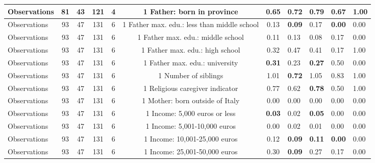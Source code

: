 \begin{tabular}{l c c c c c c }
\midrule
Observations &        81 &        43 &       121 &         4 &         1
Father: born in province &      0.65 &      0.72 & \textbf{     0.79} &      0.67 &      1.00 \\
\midrule
Observations &        93 &        47 &       131 &         6 &         1
Father max. edu.: less than middle school &      0.13 & \textbf{     0.09} &      0.17 & \textbf{     0.00} &      0.00 \\
\midrule
Observations &        93 &        47 &       131 &         6 &         1
Father max. edu.: middle school &      0.11 &      0.13 &      0.08 &      0.17 &      0.00 \\
\midrule
Observations &        93 &        47 &       131 &         6 &         1
Father max. edu.: high school &      0.32 &      0.47 &      0.41 &      0.17 &      1.00 \\
\midrule
Observations &        93 &        47 &       131 &         6 &         1
Father max. edu.: university & \textbf{     0.31} &      0.23 & \textbf{     0.27} &      0.50 &      0.00 \\
\midrule
Observations &        93 &        47 &       131 &         6 &         1
Number of siblings &      1.01 & \textbf{     0.72} &      1.05 &      0.83 &      1.00 \\
\midrule
Observations &        93 &        47 &       131 &         6 &         1
Religious caregiver indicator &      0.77 &      0.62 & \textbf{     0.78} &      0.50 &      1.00 \\
\midrule
Observations &        93 &        47 &       131 &         6 &         1
Mother: born outside of Italy &      0.00 &      0.00 &      0.00 &      0.00 &      0.00 \\
\midrule
Observations &        93 &        47 &       131 &         6 &         1
Income: 5,000 euros or less & \textbf{     0.03} &      0.02 & \textbf{     0.05} &      0.00 &      0.00 \\
\midrule
Observations &        93 &        47 &       131 &         6 &         1
Income: 5,001-10,000 euros &      0.00 &      0.02 &      0.01 &      0.00 &      0.00 \\
\midrule
Observations &        93 &        47 &       131 &         6 &         1
Income: 10,001-25,000 euros &      0.12 & \textbf{     0.09} & \textbf{     0.11} & \textbf{     0.00} &      0.00 \\
\midrule
Observations &        93 &        47 &       131 &         6 &         1
Income: 25,001-50,000 euros &      0.30 & \textbf{     0.09} &      0.27 &      0.17 &      0.00 \\

\end{tabular}
